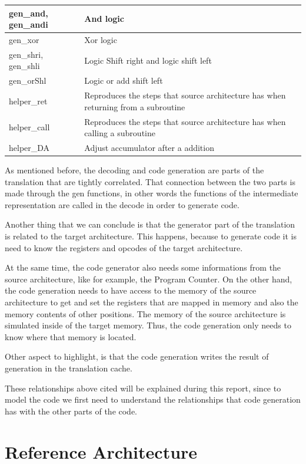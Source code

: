 \documentclass{report}
\begin{document}
\begin{table}[h]
\begin{tabular}{|l|p{10cm}|}
			gen\_and, gen\_andi				  &	And logic \\ \hline 
			gen\_xor						  &	Xor logic \\ \hline 
			gen\_shri, gen\_shli			  &	Logic Shift right and logic shift left \\ \hline 
			gen\_orShl 						  &	Logic or add shift left\\ \hline 
			helper\_ret 					  & Reproduces the steps that source architecture has when returning from a subroutine	\\ \hline 
			helper\_call 					  & Reproduces the steps that source architecture has when calling a subroutine	\\ \hline 
			helper\_DA						  &	Adjust accumulator after a addition \\ \hline 
		\end{tabular}
	\end{table} 
	
	As mentioned before, the decoding and code generation are parts of the translation that are tightly correlated. That connection between the two parts is made through the gen functions, in other words the functions of the intermediate representation are called in the decode in order to generate code.
	
	Another thing that we can conclude is that the generator part of the translation is related to the target architecture. This happens, because to generate code it is need to know the registers and opcodes of the target architecture.
	
	At the same time, the code generator also needs some informations from the source architecture, like for example, the Program Counter.  On the other hand, the code generation needs to have access to the memory of the source architecture to get and set the registers that are mapped in memory and also the memory contents of other positions. The memory of the source architecture is simulated inside of the target memory.  Thus, the code generation only needs to know where that memory is located.
	
	Other aspect to highlight, is that the code generation writes the result of generation in the translation cache.
	
	These relationships above cited will be explained during this report, since to model the code we first need to understand the relationships that code generation has with the other parts of the code.
	\clearpage

	\section{Reference Architecture}
	
\end{document}
